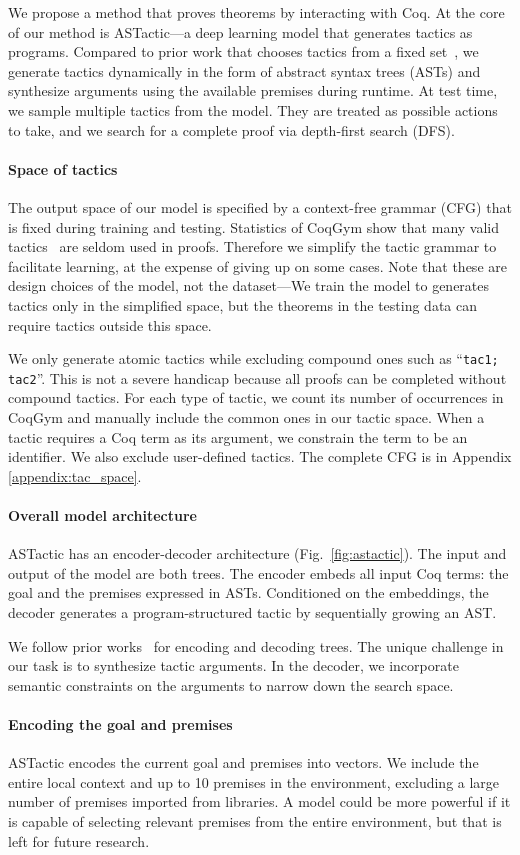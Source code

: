 \documentclass{article}
\newcommand{\smallsec}[1]{\vspace{-3mm} \paragraph{#1}}
\newcommand{\datasetname}{CoqGym}
\begin{document}
We propose a method that proves theorems by interacting with Coq.
At the core of our method is ASTactic---a deep learning model that generates tactics as programs.
Compared to prior work that chooses tactics from a fixed set~\citep{huang2018gamepad,gransden2015sepia,gauthier2018learning,bansal2019holist}, we generate tactics dynamically in the form of abstract syntax trees (ASTs) and synthesize arguments using the available premises during runtime.
At test time, we sample multiple tactics from the model.
They are treated as possible actions to take, and we search for a complete proof via depth-first search (DFS).


\smallsec{Space of tactics}
The output space of our model is specified by a context-free grammar (CFG) that is fixed during training and testing.
Statistics of {\datasetname } show that many valid tactics~\citep{delahaye2000tactic} are seldom used in proofs.
Therefore we simplify the tactic grammar to facilitate learning, at the expense of giving up on some cases. 
Note that these are design choices of the model, not the dataset---We train the model to generates tactics only in the simplified space, but the theorems in the testing data can require tactics outside this space. 


We only generate atomic tactics while excluding compound ones such as ``\texttt{tac1; tac2}''.
This is not a severe handicap because all proofs can be completed without compound tactics.
For each type of tactic, we count its number of occurrences in {\datasetname } and manually include the common ones in our tactic space.
When a tactic requires a Coq term as its argument, we constrain the term to be an identifier.
We also exclude user-defined tactics.
The complete CFG is in Appendix \ref{appendix:tac_space}.


\smallsec{Overall model architecture}
ASTactic has an encoder-decoder architecture (Fig.~\ref{fig:astactic}). 
The input and output of the model are both trees.
The encoder embeds all input Coq terms: the goal and the premises expressed in ASTs. 
Conditioned on the embeddings, the decoder generates a program-structured tactic by sequentially growing an AST.

We follow prior works~\citep{tai2015improved, yin2017syntactic} for encoding and decoding trees.
The unique challenge in our task is to synthesize tactic arguments.
In the decoder, we incorporate semantic constraints on the arguments to narrow down the search space.



\smallsec{Encoding the goal and premises}
ASTactic encodes the current goal and premises into vectors.
We include the entire local context and up to 10 premises in the environment, excluding a large number of premises imported from libraries.
A model could be more powerful if it is capable of selecting relevant premises from the entire environment, but that is left for future research.
\end{document}

